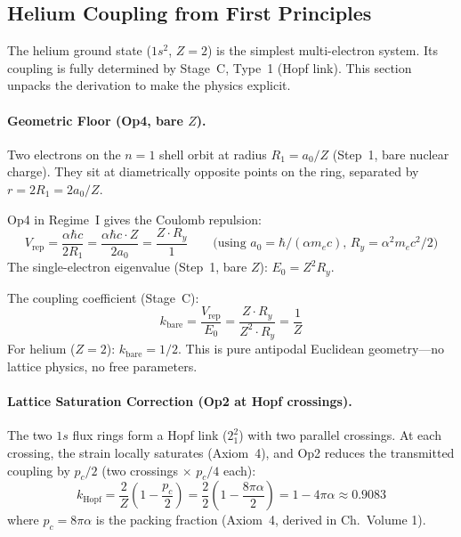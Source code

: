 \subsection{Helium Coupling from First Principles}
\label{sec:lattice_js2}

The helium ground state ($1s^2$, $Z = 2$) is the simplest
multi-electron system.  Its coupling is fully determined by
Stage~C, Type~1 (Hopf link).  This section unpacks the
derivation to make the physics explicit.

\paragraph{Geometric Floor (Op4, bare $Z$).}
Two electrons on the $n = 1$ shell orbit at radius
$R_1 = a_0 / Z$ (Step~1, bare nuclear charge).
They sit at diametrically opposite points on the ring,
separated by $r = 2R_1 = 2a_0/Z$.

Op4 in Regime~I gives the Coulomb repulsion:
\begin{equation}
    V_{\text{rep}} = \frac{\alpha\hbar c}{2R_1}
    = \frac{\alpha\hbar c \cdot Z}{2 a_0}
    = \frac{Z \cdot R_y}{1}
    \qquad\text{(using $a_0 = \hbar/(\alpha m_e c)$,
    $R_y = \alpha^2 m_e c^2/2$)}
\end{equation}
The single-electron eigenvalue (Step~1, bare $Z$):
$E_0 = Z^2 R_y$.

The coupling coefficient (Stage~C):
\begin{equation}
    k_{\text{bare}} = \frac{V_{\text{rep}}}{E_0}
    = \frac{Z \cdot R_y}{Z^2 \cdot R_y}
    = \frac{1}{Z}
    \label{eq:k_bare_he}
\end{equation}
For helium ($Z = 2$): $k_{\text{bare}} = 1/2$.
This is pure antipodal Euclidean geometry---no lattice
physics, no free parameters.

\paragraph{Lattice Saturation Correction (Op2 at Hopf crossings).}
The two $1s$ flux rings form a Hopf link ($2_1^2$) with
two parallel crossings.  At each crossing, the strain
locally saturates (Axiom~4), and Op2 reduces the
transmitted coupling by $p_c/2$
(two crossings $\times$ $p_c/4$ each):
\begin{equation}
    k_{\text{Hopf}} = \frac{2}{Z}\!\left(1 - \frac{p_c}{2}\right)
    = \frac{2}{2}\!\left(1 - \frac{8\pi\alpha}{2}\right)
    = 1 - 4\pi\alpha
    \approx 0.9083
    \label{eq:k_hopf_he}
\end{equation}
where $p_c = 8\pi\alpha$ is the packing fraction
(Axiom~4, derived in Ch.~Volume 1).

